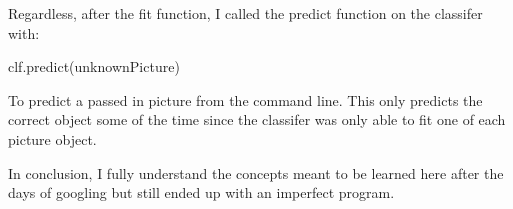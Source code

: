 \documentclass[a4paper,12pt]{article}
\begin{document}
Regardless, after the fit function, I called the predict function on the classifer with:

clf.predict(unknownPicture)

To predict a passed in picture from the command line. This only predicts the correct object some of the time since the classifer was only able to fit one of each picture object.

In conclusion, I fully understand the concepts meant to be learned here after the days of googling but still ended up with an imperfect program.
\end{document}
